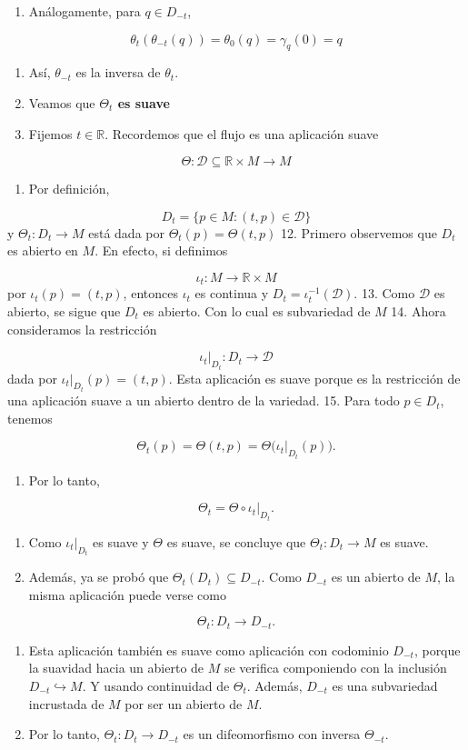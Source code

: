 \begin{bookproof}{}
\begin{enumerate}[start=7]
\item Análogamente, para $q\in D_{-t}$,
\end{enumerate}
\[
\theta_t(\theta_{-t}(q))=\theta_0(q)=\gamma_{q}(0)=q
\]
\begin{enumerate}[start=8]
\item Así, $\theta_{-t}$ es la inversa de $\theta_t$.
\item Veamos que \textbf{$\Theta_{t}$ es suave}
\item Fijemos $t\in\mathbb R$. Recordemos que el flujo es una aplicación suave
\end{enumerate}
\[
\Theta:\mathcal D\subseteq\mathbb R\times M\to M
\]
\begin{enumerate}[start=11]
\item Por definición,
\end{enumerate}
\[
D_t=\{p\in M:(t,p)\in\mathcal D\}
\]
y $\Theta_t:D_t\to M$ está dada por $\Theta_t(p)=\Theta(t,p)$ 12. Primero observemos que $D_t$ es abierto en $M$. En efecto, si definimos

\[
\iota_t:M\to\mathbb R\times M
\]
por $\iota_t(p)=(t,p)$, entonces $\iota_t$ es continua y $D_t=\iota_t^{-1}(\mathcal D)$. 13. Como $\mathcal D$ es abierto, se sigue que $D_t$ es abierto. Con lo cual es subvariedad de $M$ 14. Ahora consideramos la restricción

\[
\iota_t|_{D_t}:D_t\to\mathcal D
\]
dada por $\iota_t|_{D_t}(p)=(t,p)$. Esta aplicación es suave porque es la restricción de una aplicación suave a un abierto dentro de la variedad. 15. Para todo $p\in D_t$, tenemos

\[
\Theta_t(p)=\Theta(t,p)=\Theta\big(\iota_t|_{D_t}(p)\big).
\]
\begin{enumerate}[start=16]
\item Por lo tanto,
\end{enumerate}
\[
\Theta_t=\Theta\circ \iota_t|_{D_t}.
\]
\begin{enumerate}[start=17]
\item Como $\iota_t|_{D_t}$ es suave y $\Theta$ es suave, se concluye que $\Theta_t:D_t\to M$ es suave.
\item Además, ya se probó que $\Theta_t(D_t)\subseteq D_{-t}$. Como $D_{-t}$ es un abierto de $M$, la misma aplicación puede verse como
\end{enumerate}
\[
\Theta_t:D_t\to D_{-t}.
\]
\begin{enumerate}[start=19]
\item Esta aplicación también es suave como aplicación con codominio $D_{-t}$, porque la suavidad hacia un abierto de $M$ se verifica componiendo con la inclusión $D_{-t}\hookrightarrow M$. Y usando continuidad de $\Theta_{t}$. Además, $D_{-t}$ es una subvariedad incrustada de $M$ por ser un abierto de $M$.
\item Por lo tanto, $\Theta_t:D_t\to D_{-t}$ es un difeomorfismo con inversa $\Theta_{-t}$.
\end{enumerate}
\bookqed
\end{bookproof}
